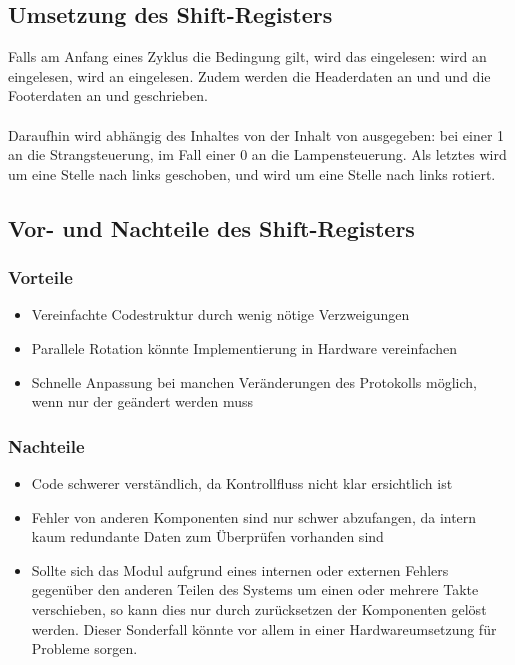 \documentclass{article}
\begin{document}
    \subsection{Umsetzung des Shift-Registers}
        Falls am Anfang eines Zyklus die Bedingung  gilt, wird das  eingelesen:  wird an  eingelesen,  wird an  eingelesen. Zudem werden die Headerdaten  an  und  und die Footerdaten  an  und  geschrieben.\\
        \\
        Daraufhin wird abhängig des Inhaltes von  der Inhalt von  ausgegeben: bei einer 1 an die Strangsteuerung, im Fall einer 0 an die Lampensteuerung. Als letztes wird  um eine Stelle nach links geschoben, und  wird um eine Stelle nach links rotiert.

    \subsection{Vor- und Nachteile des Shift-Registers}
	\subsubsection{Vorteile}
    	\begin{itemize}
    		\item Vereinfachte Codestruktur durch wenig nötige Verzweigungen
    		\item Parallele Rotation könnte Implementierung in Hardware vereinfachen
    		\item Schnelle Anpassung bei manchen Veränderungen des Protokolls möglich, wenn nur der  geändert werden muss
    	\end{itemize}
	\subsubsection{Nachteile}
    	\begin{itemize}
    		\item Code schwerer verständlich, da Kontrollfluss nicht klar ersichtlich ist
    		\item Fehler von anderen Komponenten sind nur schwer abzufangen, da intern kaum redundante Daten zum Überprüfen vorhanden sind
    		\item Sollte sich das Modul aufgrund eines internen oder externen Fehlers gegenüber den anderen Teilen des Systems um einen oder mehrere Takte verschieben, so kann dies nur durch zurücksetzen der Komponenten gelöst werden. Dieser Sonderfall könnte vor allem in einer Hardwareumsetzung für Probleme sorgen.
    	\end{itemize}
\end{document}
